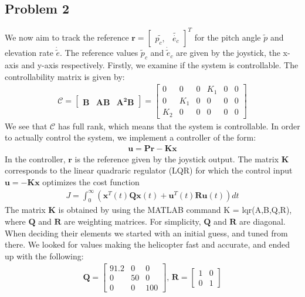\subsection{Problem 2}
We now aim to track the reference $\mathbf{r}
= \begin{bmatrix} \tilde{p_c,} & \tilde{\dot{e_c}}
\end{bmatrix}^T$ for the pitch angle $\tilde{p}$ and elevation rate $\dot{\tilde{e}}$. The reference values $\tilde{p}_c$ and $\dot{\tilde{e}}_c$ are given by the joystick, the x-axis and y-axis respectively. Firstly, we examine if the system is controllable. The controllability matrix is given by:
\begin{gather*}
    \mathcal{C} = 
    \begin{bmatrix} \mathbf{B} & \mathbf{AB} &
    \mathbf{A^2B} \end{bmatrix}
    = \begin{bmatrix}
    0 & 0 & 0 & K_1 & 0 & 0 \\
    0 & K_1 & 0 & 0 & 0 & 0 \\
    K_2 & 0 & 0 & 0 & 0 & 0
    \end{bmatrix}
\end{gather*}
We see that $\mathcal{C}$ has full rank, which means that the system is controllable. In order to actually control the system, we implement a controller of the form:
\begin{gather*}
    \mathbf{u} = \mathbf{Pr} - \mathbf{Kx}
\end{gather*}
In the controller, $\mathbf{r}$ is the reference given by the joystick output. The matrix $\mathbf{K}$ corresponds to the linear quadraric regulator (LQR) for which the control input $\mathbf{u} = -\mathbf{Kx}$ optimizes the cost function
\begin{gather*}
    \mathit{J} = \int_{0}^{\infty}(\mathbf{x}^T(t)
    \mathbf{Qx}(t) + \mathbf{u}^T(t)\mathbf{Ru}(t))
    \mathit{dt}
\end{gather*}
The matrix $\mathbf{K}$ is obtained by using the MATLAB command K = lqr(A,B,Q,R), where $\mathbf{Q}$ and $\mathbf{R}$ are weighting matrices. For simplicity, $\mathbf{Q}$ and $\mathbf{R}$ are diagonal. When deciding their elements we started with an initial guess, and tuned from there. We looked for values making the helicopter fast and accurate, and ended up with the following:
\begin{gather*}
    \mathbf{Q} = \begin{bmatrix}
    91.2 & 0 & 0 \\ 
    0 & 50 & 0 \\
    0 & 0 & 100 \end{bmatrix}\textbf{, } \mathbf{R} = \begin{bmatrix} 1 & 0 \\ 0 & 1 \end{bmatrix}
\end{gather*}
